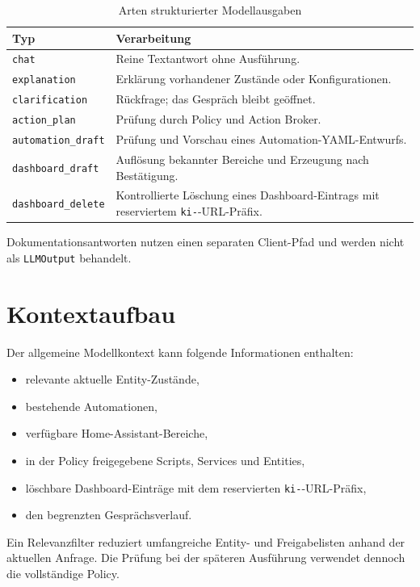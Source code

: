 \documentclass[
  11pt,
  a4paper,
  oneside,
  parskip=half
]{scrreprt}
\newcommand{\code}[1]{\texttt{#1}}
\begin{document}
\begin{table}[htbp]
  \centering
  \begin{tabularx}{\textwidth}{@{}L{42mm}Y@{}}
    \toprule
    \textbf{Typ} & \textbf{Verarbeitung} \\
    \midrule
    \code{chat} & Reine Textantwort ohne Ausführung. \\
    \code{explanation} & Erklärung vorhandener Zustände oder Konfigurationen. \\
    \code{clarification} & Rückfrage; das Gespräch bleibt geöffnet. \\
    \code{action\_plan} & Prüfung durch Policy und Action Broker. \\
    \code{automation\_draft} & Prüfung und Vorschau eines Automation-YAML-Entwurfs. \\
    \code{dashboard\_draft} & Auflösung bekannter Bereiche und Erzeugung nach Bestätigung. \\
    \code{dashboard\_delete} & Kontrollierte Löschung eines Dashboard-Eintrags mit
    reserviertem \code{ki-}-URL-Präfix. \\
    \bottomrule
  \end{tabularx}
  \caption{Arten strukturierter Modellausgaben}
\end{table}

Dokumentationsantworten nutzen einen separaten Client-Pfad und werden nicht als
\code{LLMOutput} behandelt.

\section{Kontextaufbau}

Der allgemeine Modellkontext kann folgende Informationen enthalten:

\begin{itemize}
  \item relevante aktuelle Entity-Zustände,
  \item bestehende Automationen,
  \item verfügbare Home-Assistant-Bereiche,
  \item in der Policy freigegebene Scripts, Services und Entities,
  \item löschbare Dashboard-Einträge mit dem reservierten \code{ki-}-URL-Präfix,
  \item den begrenzten Gesprächsverlauf.
\end{itemize}

Ein Relevanzfilter reduziert umfangreiche Entity- und Freigabelisten anhand der aktuellen
Anfrage. Die Prüfung bei der späteren Ausführung verwendet dennoch die vollständige
Policy.
\end{document}
